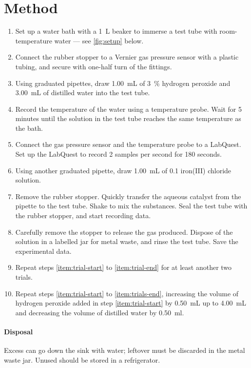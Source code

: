 \documentclass[a4paper, 12pt]{article}
\begin{document}
\section*{Method}
\begin{enumerate}
    \item Set up a water bath with a \SI{1}{\L} beaker to immerse a test tube with room-temperature water --- see \cref{fig:setup} below.
    \item Connect the rubber stopper to a Vernier gas pressure sensor with a plastic tubing, and secure with one-half turn of the fittings.
    \item \label{item:trial-start} Using graduated pipettes, draw \SI{1.00}{\mL} of \SI{3}{\%} hydrogen peroxide and \SI{3.00}{\mL} of distilled water into the test tube.
    \item Record the temperature of the water using a temperature probe. Wait for 5 minutes until the solution in the test tube reaches the same temperature as the bath.
    \item Connect the gas pressure sensor and the temperature probe to a LabQuest. Set up the LabQuest to record 2 samples per second for 180 seconds.
    \item Using another graduated pipette, draw \SI{1.00}{\mL} of \SI{0.1}{\molar} iron(III) chloride solution.
    \item Remove the rubber stopper. Quickly transfer the aqueous catalyst from the pipette to the test tube. Shake to mix the substances. Seal the test tube with the rubber stopper, and start recording data.
    \item \label{item:trial-end} Carefully remove the stopper to release the gas produced. Dispose of the solution in a labelled jar for metal waste, and rinse the test tube. Save the experimental data.
    \item \label{item:trials-end} Repeat steps \ref{item:trial-start} to \ref{item:trial-end} for at least another two trials.
    \item Repeat steps \ref{item:trial-start} to \ref{item:trials-end}, increasing the volume of hydrogen peroxide added in step \ref{item:trial-start} by \SI{0.50}{\mL} up to \SI{4.00}{\mL} and decreasing the volume of distilled water by \SI{0.50}{\ml}.
\end{enumerate}
\paragraph{Disposal} Excess  can go down the sink with water; leftover  must be discarded in the metal waste jar. Unused  should be stored in a refrigerator.
\end{document}
